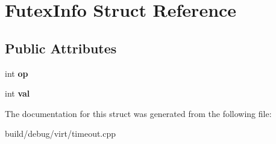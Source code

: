 \hypertarget{structFutexInfo}{\section{Futex\-Info Struct Reference}
\label{structFutexInfo}
}
\subsection*{Public Attributes}
\begin{DoxyCompactItemize}
\item 
\hypertarget{structFutexInfo_a24227fad66bcbb6bc48d7f8654ab5b0d}{int {\bfseries op}}\label{structFutexInfo_a24227fad66bcbb6bc48d7f8654ab5b0d}

\item 
\hypertarget{structFutexInfo_adb37bc77473f7add35227a9b9db7692d}{int {\bfseries val}}\label{structFutexInfo_adb37bc77473f7add35227a9b9db7692d}

\end{DoxyCompactItemize}


The documentation for this struct was generated from the following file\-:\begin{DoxyCompactItemize}
\item 
build/debug/virt/timeout.\-cpp\end{DoxyCompactItemize}
